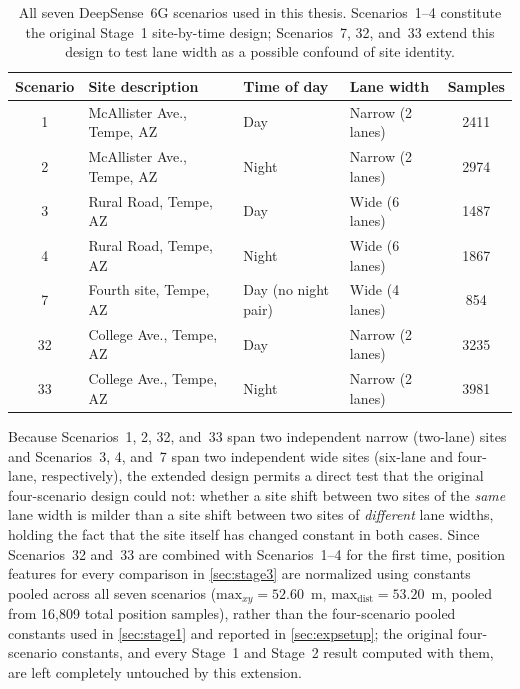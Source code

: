 \documentclass{iutbscthesis}
\begin{document}
\begin{table}[H]
    \centering
    \begin{tabular}{c p{} p{} p{} c}
        \toprule
        Scenario & Site description & Time of day & Lane width & Samples \\
        \midrule
        1 & McAllister Ave., Tempe, AZ & Day & Narrow (2 lanes) & 2411 \\
        2 & McAllister Ave., Tempe, AZ & Night & Narrow (2 lanes) & 2974 \\
        3 & Rural Road, Tempe, AZ & Day & Wide (6 lanes) & 1487 \\
        4 & Rural Road, Tempe, AZ & Night & Wide (6 lanes) & 1867 \\
        7 & Fourth site, Tempe, AZ & Day (no night pair) & Wide (4 lanes) & 854 \\
        32 & College Ave., Tempe, AZ & Day & Narrow (2 lanes) & 3235 \\
        33 & College Ave., Tempe, AZ & Night & Narrow (2 lanes) & 3981 \\
        \bottomrule
    \end{tabular}
    \caption{All seven DeepSense~6G scenarios used in this thesis. Scenarios~1--4 constitute the original Stage~1 site-by-time design; Scenarios~7, 32, and~33 extend this design to test lane width as a possible confound of site identity.}
    \label{tab:extendedscenarios}
\end{table}

Because Scenarios~1, 2, 32, and~33 span two independent narrow (two-lane) sites and Scenarios~3, 4, and~7 span two independent wide sites (six-lane and four-lane, respectively), the extended design permits a direct test that the original four-scenario design could not: whether a site shift between two sites of the \emph{same} lane width is milder than a site shift between two sites of \emph{different} lane widths, holding the fact that the site itself has changed constant in both cases. Since Scenarios~32 and~33 are combined with Scenarios~1--4 for the first time, position features for every comparison in \autoref{sec:stage3} are normalized using constants pooled across all seven scenarios ($\text{max}_{xy} = 52.60$~m, $\text{max}_{\text{dist}} = 53.20$~m, pooled from 16{,}809 total position samples), rather than the four-scenario pooled constants used in \autoref{sec:stage1} and reported in \autoref{sec:expsetup}; the original four-scenario constants, and every Stage~1 and Stage~2 result computed with them, are left completely untouched by this extension.
\end{document}
